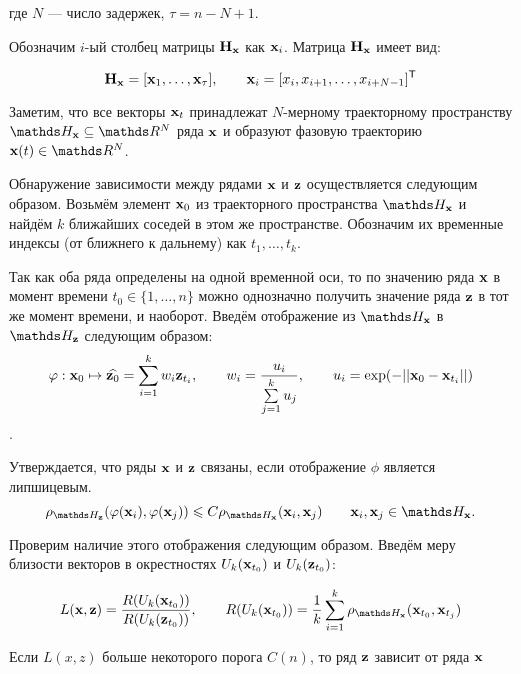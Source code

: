\documentclass[a4paper, 12pt]{article}
\begin{document}
где $N$ --- число задержек, $\tau = n - N + 1$.

Обозначим $i\text{-ый}$ столбец матрицы $\mathbf{H}_{\mathbf{x}}$ как $\mathbf{x}_i$. 
Матрица $\mathbf{H}_{\mathbf{x}}$ имеет вид:

\begin{equation*} \label{eq:traj_mat_short}
	\mathbf{H}_{\mathbf{x}} = [\mathbf{x}_1, \ldots, \mathbf{x}_{\tau}], \qquad \mathbf{x}_i = [x_i, x_{i+1}, \ldots, x_{i+N-1}]^{\mathsf{T}} 
\end{equation*}

Заметим, что все векторы $\mathbf{x}_t$ принадлежат $N\text{-мерному}$ траекторному пространству $\dH_{\bx} \subseteq \dR^N$ ряда $\mathbf{x}$ и образуют фазовую траекторию $\bx(t) \in \dR^N$.

Обнаружение зависимости между рядами $\mathbf{x}$ и $\mathbf{z}$ осуществляется следующим образом. Возьмём элемент $\mathbf{x}_0$ из траекторного пространства $\dH_{\bx}$ и найдём $k$ ближайших соседей в этом же пространстве. Обозначим их временные индексы (от ближнего к дальнему) как $t_1, \ldots, t_k$.

Так как оба ряда определены на одной временной оси, то по значению ряда $\mathbf{x}$ в момент времени $t_0 \in \{ 1, \ldots, n\}$ можно однозначно получить значение ряда $\mathbf{z}$ в тот же момент времени, и наоборот. Введём отображение из $\dH_{\bx}$ в $\dH_{\bz}$ следующим образом: 
$$ \varphi: \mathbf{x}_0 \mapsto \widehat{\mathbf{z}_0} = \sum\limits_{i=1}^k w_i \mathbf{z}_{t_i}, \qquad 
w_i = \dfrac{u_i}{\sum\limits_{j=1}^k u_j}, \qquad
u_i = \exp(-||\mathbf{x}_0 - \mathbf{x}_{t_i}||)$$.

Утверждается, что ряды $\mathbf{x}$ и $\mathbf{z}$ связаны, если отображение $\phi$ является липшицевым.
$$ \rho_{\dH_{\bz}}(\phi(\bx_i), \phi(\bx_j)) \leq C \rho_{\dH_{\bx}}(\bx_i, \bx_j) \qquad \bx_i, \bx_j \in \dH_{\bx}. $$

Проверим наличие этого отображения следующим образом. Введём меру близости векторов в окрестностях $U_k(\mathbf{x}_{t_0})$ и $U_k(\mathbf{z}_{t_0})$:

\begin{equation}
	L(\bx, \bz) = \dfrac{R(U_k(\bx_{t_0}))}{R(U_k(\bz_{t_0}))}, \qquad R(U_k(\bx_{t_0})) = \dfrac{1}{k} \sum\limits_{i=1}^k \rho_{\dH_{\bx}}(\bx_{t_0}, \bx_{t_j})
\end{equation}

Если $L(x, z)$ больше некоторого порога $C(n)$, то ряд $\mathbf{z}$ зависит от ряда $\mathbf{x}$

\end{document}
